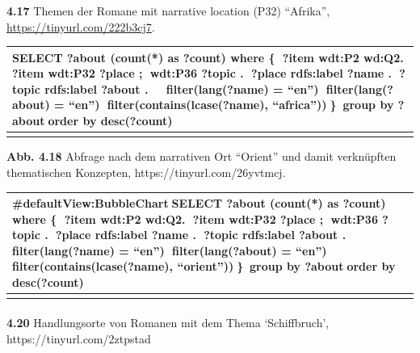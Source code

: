 \documentclass[
  12pt,
  letterpaper,
  DIV=11,
  numbers=noendperiod]{scrreprt}
\makeatletter
\let\oldparagraph\paragraph
\renewcommand{\paragraph}{
    \@ifstar
      \xxxParagraphStar
      \xxxParagraphNoStar
  }
\newcommand{\xxxParagraphStar}[1]{\oldparagraph*{#1}\mbox{}}
\newcommand{\xxxParagraphNoStar}[1]{\oldparagraph{#1}\mbox{}}
\makeatother
\begin{document}
\textbf{4.17} Themen der Romane mit narrative location (P32) ``Afrika'',
\url{https://tinyurl.com/222b3cj7}.

\begin{longtable}[]{@{}
  >{\raggedright\arraybackslash}p{}@{}}
\toprule\noalign{}
\begin{minipage}[b]{\linewidth}\raggedright
SELECT ?about (count(*) as ?count) where \{ ?item wdt:P2 wd:Q2. ?item
wdt:P32 ?place ; wdt:P36 ?topic . ?place rdfs:label ?name . ?topic
rdfs:label ?about .  filter(lang(?name) = ``en'') filter(lang(?about) =
``en'') filter(contains(lcase(?name), ``africa''))\}group by ?aboutorder
by desc(?count)
\end{minipage} \\
\midrule\noalign{}
\endhead
\bottomrule\noalign{}
\endlastfoot
\end{longtable}

\textbf{Abb. 4.18} Abfrage nach dem narrativen Ort ``Orient'' und damit
verknüpften thematischen Konzepten, https://tinyurl.com/26yvtmcj.

\begin{longtable}[]{@{}
  >{\raggedright\arraybackslash}p{}@{}}
\toprule\noalign{}
\begin{minipage}[b]{\linewidth}\raggedright
\#defaultView:BubbleChartSELECT ?about (count(*) as ?count) where \{
?item wdt:P2 wd:Q2. ?item wdt:P32 ?place ; wdt:P36 ?topic . ?place
rdfs:label ?name . ?topic rdfs:label ?about .  filter(lang(?name) =
``en'') filter(lang(?about) = ``en'') filter(contains(lcase(?name),
``orient''))\}group by ?aboutorder by desc(?count)
\end{minipage} \\
\midrule\noalign{}
\endhead
\bottomrule\noalign{}
\endlastfoot
\end{longtable}

\paragraph{\texorpdfstring{\textbf{4.20} Handlungsorte von Romanen mit
dem Thema `Schiffbruch',
https://tinyurl.com/2ztpstad}{4.20 Handlungsorte von Romanen mit dem Thema `Schiffbruch', https://tinyurl.com/2ztpstad}}\label{handlungsorte-von-romanen-mit-dem-thema-schiffbruch-httpstinyurl.com2ztpstad}
\end{document}
